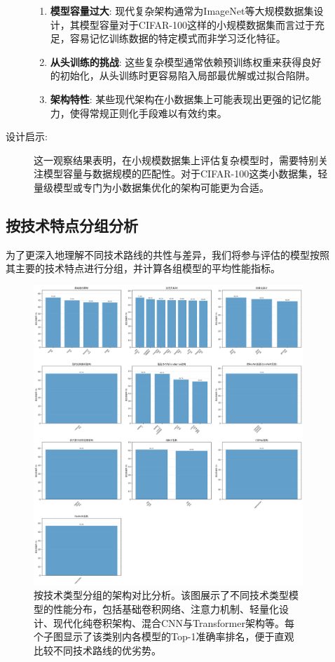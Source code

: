 \documentclass[a4paper]{article}
\begin{document}
\begin{description}
\begin{description}
\begin{enumerate}
        \item \textbf{模型容量过大}: 现代复杂架构通常为ImageNet等大规模数据集设计，其模型容量对于CIFAR-100这样的小规模数据集而言过于充足，容易记忆训练数据的特定模式而非学习泛化特征。
        \item \textbf{从头训练的挑战}: 这些复杂模型通常依赖预训练权重来获得良好的初始化，从头训练时更容易陷入局部最优解或过拟合陷阱。
        \item \textbf{架构特性}: 某些现代架构在小数据集上可能表现出更强的记忆能力，使得常规正则化手段难以有效约束。
    \end{enumerate}
    \item[设计启示:] 这一观察结果表明，在小规模数据集上评估复杂模型时，需要特别关注模型容量与数据规模的匹配性。对于CIFAR-100这类小数据集，轻量级模型或专门为小数据集优化的架构可能更为合适。
\end{description}

\subsection{按技术特点分组分析}
为了更深入地理解不同技术路线的共性与差异，我们将参与评估的模型按照其主要的技术特点进行分组，并计算各组模型的平均性能指标。

\begin{figure}[H]
    \centering
    \includegraphics[width=\textwidth]{architecture_comparison.png}
    \caption{按技术类型分组的架构对比分析。该图展示了不同技术类型模型的性能分布，包括基础卷积网络、注意力机制、轻量化设计、现代化纯卷积架构、混合CNN与Transformer架构等。每个子图显示了该类别内各模型的Top-1准确率排名，便于直观比较不同技术路线的优劣势。}
    \label{fig:arch_comparison}
\end{figure}


\end{description}
\end{document}
